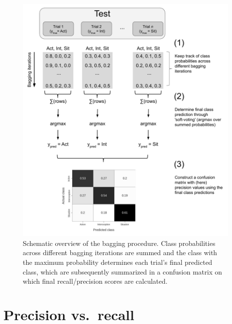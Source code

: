 \documentclass[12pt,american,a4paper,oneside,]{memoir} %
\begin{document}
\begin{figure}
\centering
\includegraphics{_bookdown_files/shared-states-files/figures/figure_S4.pdf}
\caption{\label{fig:fig-shared-states-S4}Schematic overview of the bagging procedure. Class probabilities across different bagging iterations are summed and the class with the maximum probability determines each trial's final predicted class, which are subsequently summarized in a confusion matrix on which final recall/precision scores are calculated.}
\end{figure}



\newpage
\pagestyle{empty}

\hypertarget{precision-vs.-recall}{%
\section{Precision vs.~recall}\label{precision-vs.-recall}}

\end{document}
